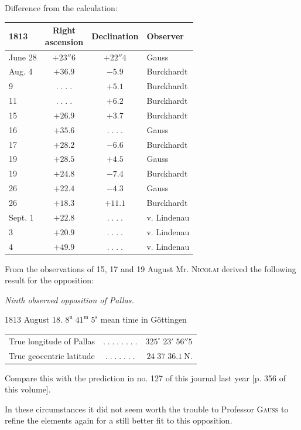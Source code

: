 \begin{center}Difference from the calculation:\end{center}
\begin{center}\fontsize{10}{12}\selectfont\setlength{\tabcolsep}{7pt}\renewcommand{\arraystretch}{1.15}\begin{tabular}{l|c|c|l}
1813 & \shortstack{Right\\ascension} & Declination & Observer\\\hline
June 28 & $+23''6$ & $+22''4$ & Gauss\\
Aug. 4 & $+36.9$ & $-5.9$ & Burckhardt\\
9 & $.\;.\;.\;.$ & $+5.1$ & Burckhardt\\
11 & $.\;.\;.\;.$ & $+6.2$ & Burckhardt\\
15 & $+26.9$ & $+3.7$ & Burckhardt\\
16 & $+35.6$ & $.\;.\;.\;.$ & Gauss\\
17 & $+28.2$ & $-6.6$ & Burckhardt\\
19 & $+28.5$ & $+4.5$ & Gauss\\
19 & $+24.8$ & $-7.4$ & Burckhardt\\
26 & $+22.4$ & $-4.3$ & Gauss\\
26 & $+18.3$ & $+11.1$ & Burckhardt\\
Sept. 1 & $+22.8$ & $.\;.\;.\;.$ & v. Lindenau\\
3 & $+20.9$ & $.\;.\;.\;.$ & v. Lindenau\\
4 & $+49.9$ & $.\;.\;.\;.$ & v. Lindenau\\
\end{tabular}\end{center}

\par\indent From the observations of 15, 17 and 19 August Mr. \textsc{Nicolai} derived the following result for the opposition:

\begin{center}\emph{Ninth observed opposition of Pallas.}\end{center}
\begin{center}1813 August 18. $8^{\mathrm u}\;41^{\mathrm m}\;5^{\mathrm s}$ mean time in Göttingen\end{center}
\begin{center}\fontsize{10}{12}\selectfont\setlength{\tabcolsep}{3pt}\renewcommand{\arraystretch}{1.15}\begin{tabular}{lcr}
True longitude of Pallas & $.\;.\;.\;.\;.\;.\;.\;.$ & $325^\circ\;23'\;56''5$\\
True geocentric latitude & $.\;.\;.\;.\;.\;.\;.$ & $24\;37\;36.1\ \mathrm{N.}$\\
\end{tabular}\end{center}

\noindent Compare this with the prediction in no. 127 of this journal last year [p. 356 of this volume].

\par\indent In these circumstances it did not seem worth the trouble to Professor \textsc{Gauss} to refine the elements again for a still better fit to this opposition.
